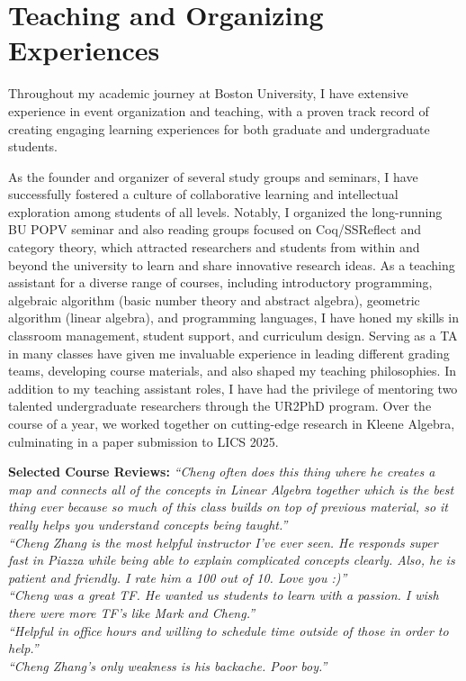 \documentclass[11pt,a4paper,sans]{moderncv} %
\begin{document}
\section{Teaching and Organizing Experiences}

Throughout my academic journey at Boston University, I have extensive experience in event organization and teaching, with a proven track record of creating engaging learning experiences for both graduate and undergraduate students.

As the founder and organizer of several study groups and seminars, I have successfully fostered a culture of collaborative learning and intellectual exploration among students of all levels. 
Notably, I organized the long-running BU POPV seminar and also reading groups focused on Coq/SSReflect and category theory, which attracted researchers and students from within and beyond the university to learn and share innovative research ideas.
As a teaching assistant for a diverse range of courses, including introductory programming, algebraic algorithm (basic number theory and abstract algebra), geometric algorithm (linear algebra), and programming languages, I have honed my skills in classroom management, student support, and curriculum design. 
Serving as a TA in many classes have given me invaluable experience in leading different grading teams, developing course materials, and also shaped my teaching philosophies.
In addition to my teaching assistant roles, I have had the privilege of mentoring two talented undergraduate researchers through the UR2PhD program. 
Over the course of a year, we worked together on cutting-edge research in Kleene Algebra, culminating in a paper submission to LICS 2025.

\textbf{Selected Course Reviews:}
\emph{``Cheng often does this thing where he creates a map and connects all of the concepts in Linear Algebra together which is the best thing ever because so much of this class builds on top of previous material, so it really helps you understand concepts being taught.''}\\[3px]
\emph{``Cheng Zhang is the most helpful instructor I've ever seen. He responds super fast in Piazza while being able to explain complicated concepts clearly. Also, he is patient and friendly. I rate him a 100 out of 10. Love you :)''}\\[3px]
\emph{``Cheng was a great TF. He wanted us students to learn with a passion. I wish there were more TF's like Mark and Cheng.''}\\[3px]
\emph{``Helpful in office hours and willing to schedule time outside of those in order to help.''}\\[3px]
\emph{``Cheng Zhang's only weakness is his backache. Poor boy.''}
\end{document}
